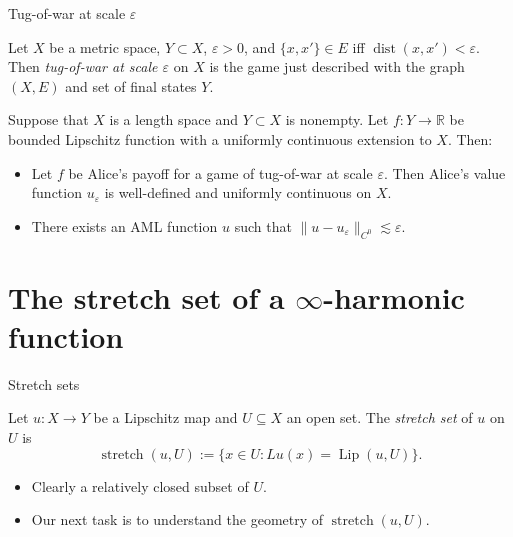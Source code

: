 \documentclass[10pt]{beamer}
\newcommand{\RR}{\mathbb{R}}
\DeclareMathOperator{\dist}{dist}
\DeclareMathOperator{\Lip}{Lip}
\DeclareMathOperator{\Stretch}{stretch}
\begin{document}
\begin{frame}{Tug-of-war at scale $\varepsilon$}
\begin{definition}
Let $X$ be a metric space, $Y \subset X$, $\varepsilon > 0$, and $\{x, x'\} \in E$ iff $\dist(x, x') < \varepsilon$.
Then \emph{tug-of-war at scale $\varepsilon$} on $X$ is the game just described with the graph $(X, E)$ and set of final states $Y$.
\end{definition} 

\begin{theorem}
Suppose that $X$ is a length space and $Y \subset X$ is nonempty.
Let $f: Y \to \RR$ be bounded Lipschitz function with a uniformly continuous extension to $X$.
Then: 
\begin{itemize}
\item Let $f$ be Alice's payoff for a game of tug-of-war at scale $\varepsilon$.
Then Alice's value function $u_\varepsilon$ is well-defined and uniformly continuous on $X$.
\item There exists an AML function $u$ such that $\|u - u_\varepsilon\|_{C^0} \lesssim \varepsilon$. 
\end{itemize}
\end{theorem}
\end{frame}

\section{The stretch set of a \texorpdfstring{$\infty$-harmonic}{infinity-harmonic} function}

\begin{frame}{Stretch sets}
\begin{definition}[Thurston '86]
Let $u: X \to Y$ be a Lipschitz map and $U \subseteq X$ an open set. The \emph{stretch set} of $u$ on $U$ is 
$$\Stretch(u, U) := \{x \in U: Lu(x) = \Lip(u, U)\}.$$
\end{definition}

\begin{itemize}
\item Clearly a relatively closed subset of $U$.
\item Our next task is to understand the geometry of $\Stretch(u, U)$.
\end{itemize}
    
\end{frame}
\end{document}
